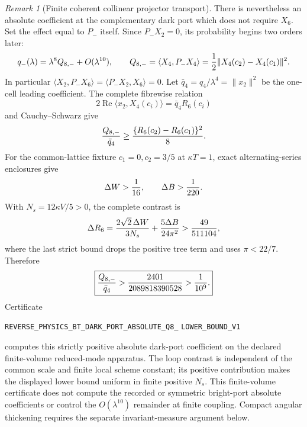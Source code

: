 \documentclass[11pt]{article}
\theoremstyle{definition}
\theoremstyle{remark}
\newtheorem{remark}[theorem]{Remark}
\begin{document}
\begin{remark}[Finite coherent collinear projector transport]
There is nevertheless an absolute coefficient at the complementary dark
port which does not require $X_6$.  Set the effect equal to $P_-$ itself.
Since $P_-X_2=0$, its probability begins two orders later:
\[
 q_-(\lambda)=\lambda^8Q_{8,-}+O(\lambda^{10}),\qquad
 Q_{8,-}=\langle X_4,P_-X_4\rangle
 ={1\over2}\|X_4(c_2)-X_4(c_1)\|^2.
\]
In particular
$\langle X_2,P_-X_6\rangle=\langle P_-X_2,X_6\rangle=0$.
Let $\bar q_4=q_4/\lambda^4=\|x_2\|^2$ be the one-cell leading
coefficient.  The complete fibrewise relation
\[
 2\operatorname{Re}\langle x_2,X_4(c_i)\rangle
 =\bar q_4R_6(c_i)
\]
and Cauchy--Schwarz give
\[
 {Q_{8,-}\over\bar q_4}\geq
 {\{R_6(c_2)-R_6(c_1)\}^2\over8}.
\]
For the common-lattice fixture $c_1=0,c_2=3/5$ at $\kappa T=1$, exact
alternating-series enclosures give
\[
 \Delta W>{1\over16},\qquad \Delta B>{1\over220}.
\]
With $N_s=12\kappa V/5>0$, the complete contrast is
\[
 \Delta R_6={2\sqrt2\,\Delta W\over3N_s}
 +{5\Delta B\over24\pi^2}>{49\over511104},
\]
where the last strict bound drops the positive tree term and uses
$\pi<22/7$.  Therefore
\[
 \boxed{{Q_{8,-}\over\bar q_4}
 >{2401\over2089818390528}>{1\over10^9}.}
\]
Certificate
\par\noindent
\texttt{REVERSE\_PHYSICS\_BT\_DARK\_PORT\_ABSOLUTE\_Q8\_}
\allowbreak\texttt{LOWER\_BOUND\_V1}
\par\noindent
computes this strictly positive absolute dark-port coefficient on the
declared finite-volume reduced-mode apparatus.  The loop contrast is
independent of the common scale and finite local scheme constant; its
positive contribution makes the displayed lower bound uniform in finite
positive $N_s$.  This finite-volume certificate does not compute the recorded
or symmetric bright-port absolute coefficients or control the
$O(\lambda^{10})$ remainder at finite coupling.  Compact angular thickening
requires the separate invariant-measure argument below.


\end{remark}
\end{document}
